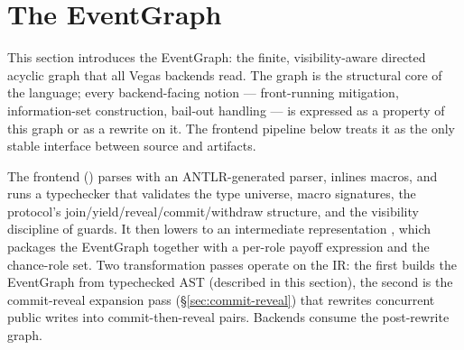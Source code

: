\section{The EventGraph}
\label{sec:eventgraph}

This section introduces the EventGraph: the finite,
visibility-aware directed acyclic graph that all Vegas backends
read.  The graph is the structural core of the language; every
backend-facing notion --- front-running mitigation, information-set
construction, bail-out handling --- is expressed as a property of
this graph or as a rewrite on it.  The frontend pipeline below
treats it as the only stable interface between source and
artifacts.

\begin{center}
\end{center}

The frontend () parses with an
ANTLR-generated parser, inlines macros, and runs a typechecker
that validates the type universe, macro signatures, the
protocol's join/yield/reveal/commit/withdraw structure, and the
visibility discipline of guards.  It then lowers to an
intermediate representation , which packages the
EventGraph together with a per-role payoff expression and the
chance-role set.  Two transformation passes operate on the IR: the
first builds the EventGraph from typechecked AST (described in
this section), the second is the commit-reveal expansion pass
(\S\ref{sec:commit-reveal}) that rewrites concurrent public writes
into commit-then-reveal pairs.  Backends consume the post-rewrite
graph.

